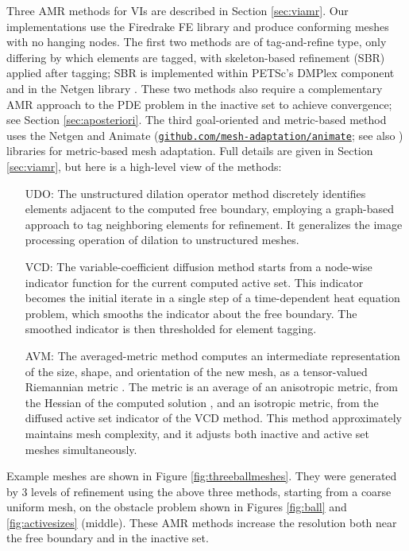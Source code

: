 \documentclass[]{interact}
\theoremstyle{plain}%
\theoremstyle{definition}
\theoremstyle{remark}
\begin{document}
Three AMR methods for VIs are described in Section \ref{sec:viamr}.  Our implementations use the Firedrake FE library \cite{Rathgeberetal2016} and produce conforming meshes with no hanging nodes.  The first two methods are of tag-and-refine type, only differing by which elements are tagged, with skeleton-based refinement (SBR) \cite{PlazaCarey2000} applied after tagging; SBR is implemented within PETSc's DMPlex component \cite{petsc-user-ref} and in the Netgen library \cite{Betteridgeetal2024}.  These two methods also require a complementary AMR approach to the PDE problem in the inactive set to achieve convergence; see Section \ref{sec:aposteriori}.  The third goal-oriented and metric-based method uses the Netgen and Animate (\href{https://github.com/mesh-adaptation/animate}{{\small \texttt{github.com/mesh-adaptation/animate}}}; see also \cite{Wallworketal2020}) libraries for metric-based mesh adaptation.  Full details are given in Section \ref{sec:viamr}, but here is a high-level view of the methods:

\begin{itemize}
\item[UDO:] The unstructured dilation operator method discretely identifies elements adjacent to the computed free boundary, employing a graph-based approach to tag neighboring elements for refinement.  It generalizes the image processing operation of dilation \cite{Pratt1991} to unstructured meshes.
\item[VCD:] The variable-coefficient diffusion method starts from a node-wise indicator function for the current computed active set.  This indicator becomes the initial iterate in a single step of a time-dependent heat equation problem, which smooths the indicator about the free boundary.  The smoothed indicator is then thresholded for element tagging.
\item[AVM:] The averaged-metric method computes an intermediate representation of the size, shape, and orientation of the new mesh, as a tensor-valued Riemannian metric \cite{Alauzet2010}.  The metric is an average of an anisotropic metric, from the Hessian of the computed solution \cite{Wallworketal2020}, and an isotropic metric, from the diffused active set indicator of the VCD method.  This method approximately maintains mesh complexity, and it adjusts both inactive and active set meshes simultaneously.
\end{itemize}

Example meshes are shown in Figure \ref{fig:threeballmeshes}.  They were generated by 3 levels of refinement using the above three methods, starting from a coarse uniform mesh, on the obstacle problem shown in Figures \ref{fig:ball} and \ref{fig:activesizes} (middle).  These AMR methods increase the resolution both near the free boundary and in the inactive set.
\end{document}

